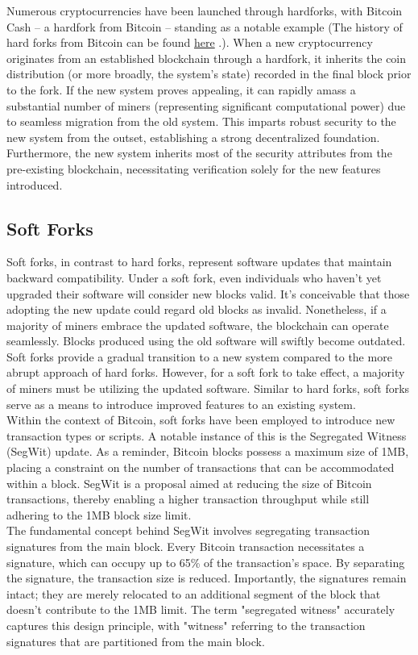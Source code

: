 \documentclass{report}
\begin{document}
Numerous cryptocurrencies have been launched through hardforks, with Bitcoin Cash – a hardfork from Bitcoin – standing as a notable example (The history of hard forks from Bitcoin can be found \href{https://www.investopedia.com/tech/history-bitcoin-hard-forks/}{here} .). When a new cryptocurrency originates from an established blockchain through a hardfork, it inherits the coin distribution (or more broadly, the system's state) recorded in the final block prior to the fork. If the new system proves appealing, it can rapidly amass a substantial number of miners (representing significant computational power) due to seamless migration from the old system. This imparts robust security to the new system from the outset, establishing a strong decentralized foundation. Furthermore, the new system inherits most of the security attributes from the pre-existing blockchain, necessitating verification solely for the new features introduced.
\subsection{Soft Forks}
Soft forks, in contrast to hard forks, represent software updates that maintain backward compatibility. Under a soft fork, even individuals who haven't yet upgraded their software will consider new blocks valid. It's conceivable that those adopting the new update could regard old blocks as invalid. Nonetheless, if a majority of miners embrace the updated software, the blockchain can operate seamlessly. Blocks produced using the old software will swiftly become outdated. Soft forks provide a gradual transition to a new system compared to the more abrupt approach of hard forks. However, for a soft fork to take effect, a majority of miners must be utilizing the updated software. Similar to hard forks, soft forks serve as a means to introduce improved features to an existing system.\\
Within the context of Bitcoin, soft forks have been employed to introduce new transaction types or scripts. A notable instance of this is the Segregated Witness (SegWit) update. As a reminder, Bitcoin blocks possess a maximum size of 1MB, placing a constraint on the number of transactions that can be accommodated within a block. SegWit is a proposal aimed at reducing the size of Bitcoin transactions, thereby enabling a higher transaction throughput while still adhering to the 1MB block size limit.\\
The fundamental concept behind SegWit involves segregating transaction signatures from the main block. Every Bitcoin transaction necessitates a signature, which can occupy up to 65\% of the transaction's space. By separating the signature, the transaction size is reduced. Importantly, the signatures remain intact; they are merely relocated to an additional segment of the block that doesn't contribute to the 1MB limit. The term "segregated witness" accurately captures this design principle, with "witness" referring to the transaction signatures that are partitioned from the main block.
\end{document}
